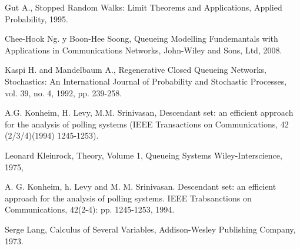 \begin{thebibliography}{99}
 Gut A., Stopped Random Walks: Limit Theorems and
Applications, Applied Probability, 1995.


 Chee-Hook Ng. y Boon-Hee Soong, Queueing
Modelling Fundemantals with Applications in Communications
Networks, John-Wiley and Sons, Ltd, 2008.



 Kaspi H. and Mandelbaum A., Regenerative Closed Queueing
Networks, Stochastics: An International Journal of Probability and
Stochastic Processes, vol. 39, no. 4, 1992, pp. 239-258.

 A.G. Konheim, H. Levy, M.M. Srinivasan, Descendant set: an efficient
approach for the analysis of polling systems (IEEE Transactions
on Communications, 42 (2/3/4)(1994) 1245-1253).

 Leonard Kleinrock, Theory, Volume 1, Queueing Systems Wiley-Interscience, 1975,


 A. G. Konheim, h. Levy and M. M. Srinivasan. Descendant set: an efficient approach for the analysis of polling systems. IEEE Trabsanctions on Communications, 42(2-4): pp. 1245-1253, 1994.



 Serge Lang, Calculus of Several Variables, Addison-Wesley Publishing Company, 1973.


\end{thebibliography}
